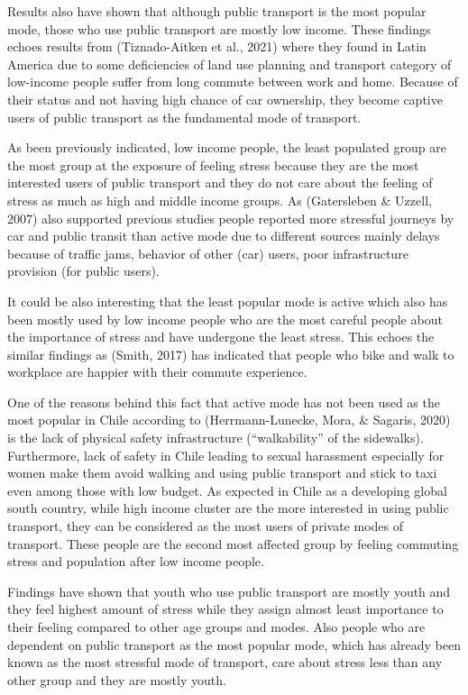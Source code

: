 \documentclass[
11pt, %
oneside, %
english, %
singlespacing, %
]{macthesis} %
\begin{document}
Results also have shown that although public transport is the most popular mode, those who use public transport are mostly low income. These findings echoes results from (Tiznado-Aitken et al., 2021) where they found in Latin America due to some deficiencies of land use planning and transport category of low-income people suffer from long commute between work and home. Because of their status and not having high chance of car ownership, they become captive users of public transport as the fundamental mode of transport.

As been previously indicated, low income people, the least populated group are the most group at the exposure of feeling stress because they are the most interested users of public transport and they do not care about the feeling of stress as much as high and middle income groups. As (Gatersleben \& Uzzell, 2007) also supported previous studies people reported more stressful journeys by car and public transit than active mode due to different sources mainly delays because of traffic jams, behavior of other (car) users, poor infrastructure provision (for public users).

It could be also interesting that the least popular mode is active which also has been mostly used by low income people who are the most careful people about the importance of stress and have undergone the least stress. This echoes the similar findings as (Smith, 2017) has indicated that people who bike and walk to workplace are happier with their commute experience.

One of the reasons behind this fact that active mode has not been used as the most popular in Chile according to (Herrmann-Lunecke, Mora, \& Sagaris, 2020) is the lack of physical safety infrastructure (``walkability'' of the sidewalks). Furthermore, lack of safety in Chile leading to sexual harassment especially for women make them avoid walking and using public transport and stick to taxi even among those with low budget.
As expected in Chile as a developing global south country, while high income cluster are the more interested in using public transport, they can be considered as the most users of private modes of transport. These people are the second most affected group by feeling commuting stress and population after low income people.

Findings have shown that youth who use public transport are mostly youth and they feel highest amount of stress while they assign almost least importance to their feeling compared to other age groups and modes. Also people who are dependent on public transport as the most popular mode, which has already been known as the most stressful mode of transport, care about stress less than any other group and they are mostly youth.
\end{document}
